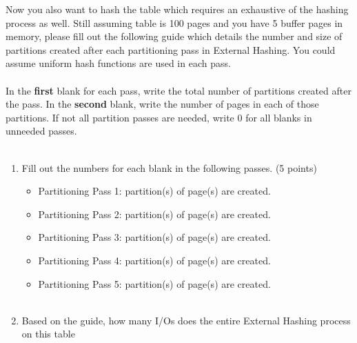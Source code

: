 \documentclass[10pt]{article}
\begin{document}
\begin{itemize}
    Now you also want to hash the table 
 which requires an exhaustive of the hashing process as well. Still assuming table is 100 pages and you have 5 buffer pages in memory, please fill out the following guide which details the number and size of partitions created after each partitioning pass in External Hashing. You could assume uniform hash functions are used in each pass.\\ \\
 In the \textbf{first} blank for each pass, write the total number of partitions created after the pass. In the \textbf{second}
blank, write the number of pages in each of those partitions. If not all partition passes are needed, write 0
for all blanks in unneeded passes.\\ \\
    \begin{enumerate}
        \item Fill out the numbers for each blank in the following passes. (5 points)\\
        \begin{itemize}
            \item Partitioning Pass 1: \underline{\quad{}\quad\quad} partition(s) of \underline{\quad{}\quad\quad} page(s) are created.\\
            \item Partitioning Pass 2: \underline{\quad{}\quad\quad} partition(s) of \underline{\quad{}\quad\quad} page(s) are created.\\
            \item Partitioning Pass 3: \underline{\quad{}\quad\quad} partition(s) of \underline{\quad{}\quad\quad} page(s) are created.\\
            \item Partitioning Pass 4: \underline{\quad{}\quad\quad} partition(s) of \underline{\quad{}\quad\quad} page(s) are created.\\
            \item Partitioning Pass 5: \underline{\quad{}\quad\quad} partition(s) of \underline{\quad{}\quad\quad} page(s) are created.\\ \\
        \end{itemize}
        \item  Based on the guide, how many I/Os does the entire External Hashing process on this table

\end{enumerate}
\end{itemize}
\end{document}
